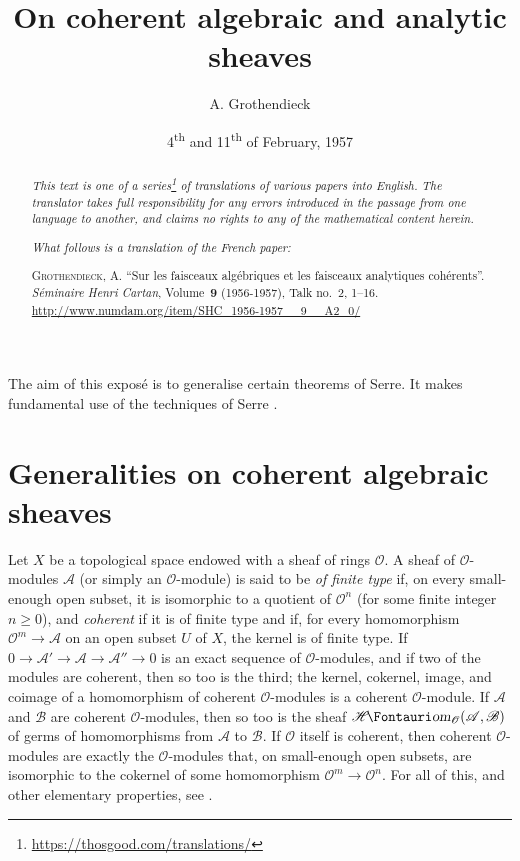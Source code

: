 \documentclass{article}
\title{On coherent algebraic and analytic sheaves}
\author{A. Grothendieck}
\date{4\textsuperscript{th} and 11\textsuperscript{th} of February, 1957}
\theoremstyle{plain}
\theoremstyle{definition}
\newcommand{\sh}{\mathscr}
\newcommand{\shHom}{\sh{H}\textup{\kern-2.2pt{\Fontauri\slshape om}}}
\renewcommand{\geq}{\geqslant}
\newcommand{\oldpage}[1]{\marginpar{\footnotesize$\Big\vert$ \textit{p.~#1}}}
\begin{document}
\maketitle
\thispagestyle{fancy}

\renewcommand{\abstractname}{Translator's note.}

\begin{abstract}
  \renewcommand*{\thefootnote}{\fnsymbol{footnote}}
  \emph{This text is one of a series\footnote{\url{https://thosgood.com/translations/}} of translations of various papers into English.}
  \emph{The translator takes full responsibility for any errors introduced in the passage from one language to another, and claims no rights to any of the mathematical content herein.}
  
  \emph{What follows is a translation of the French paper:}

  \medskip\noindent
  \textsc{Grothendieck, A.}
  ``Sur les faisceaux alg\'{e}briques et les faisceaux analytiques coh\'{e}rents''.
  \emph{S\'{e}minaire Henri Cartan}, Volume~\textbf{9} (1956-1957), Talk no.~2, 1–16.
  {\footnotesize\url{http://www.numdam.org/item/SHC_1956-1957__9__A2_0/}}
\end{abstract}

\setcounter{footnote}{0}

\tableofcontents
\bigskip



The aim of this expos\'{e} is to generalise certain theorems of Serre.
\oldpage{2-01}
It makes fundamental use of the techniques of Serre \cite{1,2,3}.


\section{Generalities on coherent algebraic sheaves}
\label{section1}

Let $X$ be a topological space endowed with a sheaf of rings $\sh{O}$.
A sheaf of $\sh{O}$-modules $\sh{A}$ (or simply an $\sh{O}$-module) is said to be \emph{of finite type} if, on every small-enough open subset, it is isomorphic to a quotient of $\sh{O}^n$ (for some finite integer $n\geq0$), and \emph{coherent} if it is of finite type and if, for every homomorphism $\sh{O}^m\to\sh{A}$ on an open subset $U$ of $X$, the kernel is of finite type.
If $0\to\sh{A}'\to\sh{A}\to\sh{A}''\to0$ is an exact sequence of $\sh{O}$-modules, and if two of the modules are coherent, then so too is the third;
the kernel, cokernel, image, and coimage of a homomorphism of coherent $\sh{O}$-modules is a coherent $\sh{O}$-module.
If $\sh{A}$ and $\sh{B}$ are coherent $\sh{O}$-modules, then so too is the sheaf $\shHom_\sh{O}(\sh{A},\sh{B})$ of germs of homomorphisms from $\sh{A}$ to $\sh{B}$.
If $\sh{O}$ itself is coherent, then coherent $\sh{O}$-modules are exactly the $\sh{O}$-modules that, on small-enough open subsets, are isomorphic to the cokernel of some homomorphism $\sh{O}^m\to\sh{O}^n$.
For all of this, and other elementary properties, see \cite[chapitre~1, paragraphe~2]{1}.
\end{document}
